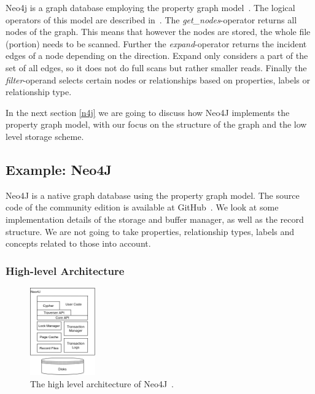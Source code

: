         
        Neo4j is a graph database employing the property graph model~\cite{robinson2015graph}.
        The logical operators of this model are described in~\autocite{Holsch2016Algeb}. 
        The \textit{get\_nodes}-operator returns all nodes of the graph.
        This means that however the nodes are stored, the whole file (portion) needs to be scanned.
        Further the \textit{expand}-operator returns the incident edges of a node depending on the direction.
        Expand only considers a part of the set of all edges, so it does not do full scans but rather smaller reads.
        Finally the \textit{filter}-operand selects certain nodes or relationships based on properties, labels or relationship type.
        
        In the next section \ref{n4j} we are going to discuss how Neo4J implements the property graph model, with our focus on the structure of the graph and the low level storage scheme.

    \subsection*{Example: Neo4J}\label{n4j}
        Neo4J is a native graph database using the property graph model.
        The source code of the community edition is available at GitHub~\autocite{GitHubneo4j}.
        We look at some implementation details of the storage and buffer manager, as well as the record structure.
        We are not going to take properties, relationship types, labels and concepts related to those into account.
        
        \subsubsection*{High-level Architecture}
        \begin{figure}[htp]
            \begin{center}
                \includegraphics[keepaspectratio,width=0.25\textwidth]{img/04-databases/N4J_HLA_Emil.png}
            \end{center}
            \caption{The high level architecture of Neo4J~\autocite{robinson2015graph}.} 
            \label{N4J_HLA_Emil}
        \end{figure}
        
